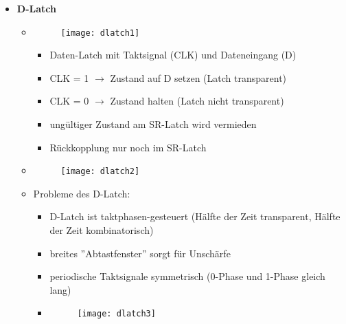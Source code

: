 \begin{itemize}
\item \textbf{D-Latch}
	\begin{itemize}
	\item[]		
				\begin{minipage}{0.25\textwidth}
					\begin{figure}[H]
					\texttt{[image: dlatch1]}
					\end{figure}
				\end{minipage}
				\begin{minipage}[t]{0.6\textwidth}
					\vspace{-1.25cm}
					\begin{itemize}
					\item Daten-Latch mit Taktsignal (CLK) und Dateneingang (D)
					\item CLK = 1 $\rightarrow$ Zustand auf D setzen (Latch transparent)
					\item CLK = 0 $\rightarrow$ Zustand halten (Latch nicht transparent)
					\item ungültiger Zustand am SR-Latch wird vermieden
					\item Rückkopplung nur noch im SR-Latch
					\end{itemize}
				\end{minipage}
				
	\item[] \begin{figure}[H]
				\begin{center}
				\texttt{[image: dlatch2]}
				\end{center}
			\end{figure}
	 
	\item Probleme des D-Latch:
		\begin{itemize}
		\item D-Latch ist taktphasen-gesteuert (Hälfte der Zeit transparent, Hälfte der Zeit kombinatorisch)
		\item breites ''Abtastfenster'' sorgt für Unschärfe
		\item periodische Taktsignale symmetrisch (0-Phase und 1-Phase gleich lang)
		\item[] \begin{figure}[H]
				\begin{center}
				\texttt{[image: dlatch3]}
				\end{center}
			\end{figure}
		\end{itemize}
	\end{itemize}

\end{itemize}

